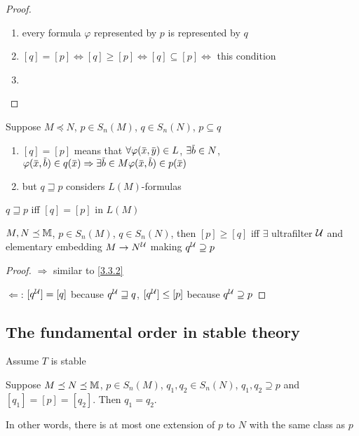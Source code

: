 \documentclass[11pt]{article}
\begin{document}
\begin{proof}
\begin{enumerate}
\item every formula \(\varphi\) represented by \(p\) is represented by \(q\)
\item \([q]=[p]\Leftrightarrow[q]\ge[p]\Leftrightarrow[q]\subseteq[p]\Leftrightarrow\) this condition
\item 
\end{enumerate}
\end{proof}

\begin{remark}
Suppose \(M\preceq N\), \(p\in S_n(M)\), \(q\in S_n(N)\), \(p\subseteq q\)
\begin{enumerate}
\item \([q]=[p]\)  means
that
\(\forall\varphi(\barx,\bary)\in L\),
\(\exists\barb\in N\), \(\varphi(\barx,\barb)\in q(\barx)\Rightarrow \exists\barb\in M\varphi(\barx,\barb)\in p(\barx)\)
\item but \(q\sqsupseteq p\) considers \(L(M)\)-formulas
\end{enumerate}


\(q\sqsupseteq p\) iff \([q]=[p]\) in \(L(M)\)
\end{remark}

\begin{proposition}[]
\(M,N\preceq\mathbb{M}\), \(p\in S_n(M)\), \(q\in S_n(N)\), then \([p]\ge[q]\) iff \(\exists\) ultrafilter \(\mathcal{U}\) and
elementary embedding \(M\to N^{\mathcal{U}}\) making \(q^{\mathcal{U}}\supseteq p\)
\end{proposition}

\begin{proof}
\(\Rightarrow\) similar to \ref{3.3.2}

\(\Leftarrow\): \([q^{\mathcal{U}}]=[q]\) because \(q^{\mathcal{U}}\sqsupseteq q\), \([q^{\mathcal{U}}]\le[p]\) because \(q^{\mathcal{U}}\supseteq p\)
\end{proof}
\subsection{The fundamental order in stable theory}
\label{sec:orgc697fb4}
Assume \(T\) is stable
\begin{lemma}[]
\label{3.31.8}
Suppose \(M\preceq N\preceq\mathbb{M}\), \(p\in S_n(M)\), \(q_1,q_2\in S_n(N)\), \(q_1,q_2\supseteq p\) and \([q_1]=[p]=[q_2]\).
Then \(q_1=q_2\).

In other words, there is at most one extension of \(p\) to \(N\) with the same class as \(p\)
\end{lemma}
\end{document}
